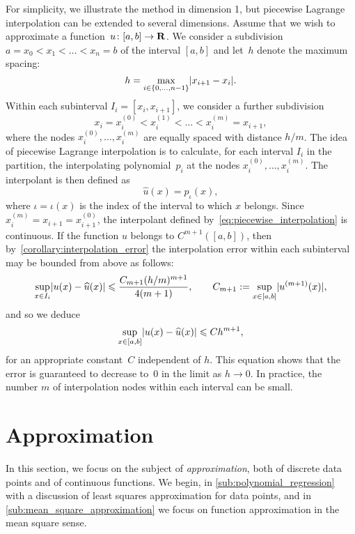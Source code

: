 For simplicity, we illustrate the method in dimension 1,
but piecewise Lagrange interpolation can be extended to several dimensions.
Assume that we wish to approximate a function~$u\colon [a, b] \to \mathbf R$.
We consider a subdivision $a = x_0 < x_1 < \dotsc < x_n = b$ of the interval $[a, b]$
and let~$h$ denote the maximum spacing:
\[
    h = \max_{i \in \{0, \dotsc, n-1\}} \lvert x_{i+1} - x_i\rvert.
\]
Within each subinterval $I_i = [x_i, x_{i+1}]$,
we consider a further subdivision
\[
    x_i = x_i^{(0)} < x_i^{(1)} < \dotsc < x_i^{(m)} = x_{i+1},
\]
where the nodes $x_i^{(0)}, \dotsc, x_i^{(m)}$ are equally spaced with distance $h/m$.
The idea of piecewise Lagrange interpolation is to calculate,
for each interval $I_i$ in the partition,
the interpolating polynomial~$p_i$ at the nodes $x_i^{(0)}, \dotsc, x_i^{(m)}$.
The interpolant is then defined as
\begin{equation}
    \label{eq:piecewise_interpolation}
    \widehat u(x) = p_{\iota}(x),
\end{equation}
where $\iota = \iota(x)$ is the index of the interval to which $x$ belongs.
Since $x_i^{(m)} = x_{i+1} = x_{i+1}^{(0)}$,
the interpolant defined by~\eqref{eq:piecewise_interpolation} is continuous.
If the function $u$ belongs to $C^{m+1}([a, b])$,
then by~\cref{corollary:interpolation_error} the interpolation error within each subinterval may be bounded from above as follows:
\begin{equation}
    \label{eq:error_estimate_piecewise_interpolation}
    \sup_{x \in I_i} \lvert u(x) - \widehat u(x)\rvert \leqslant \frac{ C_{m+1} (h/m)^{m+1}}{4(m + 1)},
    \qquad C_{m+1} := \sup_{x \in [a, b]} \lvert u^{(m+1)}(x)\rvert,
\end{equation}
and so we deduce
\begin{equation*}
    \sup_{x \in [a, b]} \lvert u(x) - \widehat u(x)\rvert \leqslant C h^{m+1},
\end{equation*}
for an appropriate constant~$C$ independent of $h$.
This equation shows that the error is guaranteed to decrease to~0 in the limit as $h \to 0$.
In practice, the number $m$ of interpolation nodes within each interval can be small.

\section{Approximation}
In this section,
we focus on the subject of \emph{approximation},
both of discrete data points and of continuous functions.
We begin, in \cref{sub:polynomial_regression} with a discussion of least squares approximation for data points,
and in \cref{sub:mean_square_approximation} we focus on function approximation in the mean square sense.

